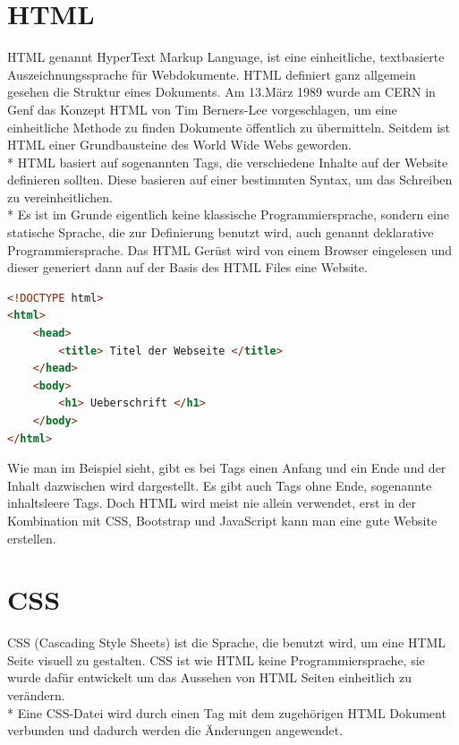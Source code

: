 \section{HTML}
\author{Benjamin Besic}
HTML genannt HyperText Markup Language, ist eine einheitliche, textbasierte Auszeichnungssprache für Webdokumente. HTML definiert ganz allgemein gesehen die Struktur eines Dokuments. 
Am 13.März 1989 wurde am CERN in Genf das Konzept HTML von Tim Berners-Lee vorgeschlagen, um eine einheitliche Methode zu finden Dokumente öffentlich zu übermitteln. Seitdem ist HTML  einer Grundbausteine des World Wide Webs geworden. \\*
HTML basiert auf sogenannten Tags, die verschiedene Inhalte auf der Website definieren sollten. Diese basieren auf einer bestimmten Syntax, um das Schreiben zu vereinheitlichen. \\*
Es ist im Grunde eigentlich keine klassische Programmiersprache, sondern eine statische Sprache, die zur Definierung benutzt wird, auch genannt deklarative Programmiersprache.  
Das HTML Gerüst wird von einem Browser eingelesen und dieser generiert dann auf der Basis des HTML Files eine Website. \cite{HTMLTut} \cite{HTMLSeoKueche}

\begin{lstlisting}[language=HTML,caption=HTML File Grundgerüst,label=lst:impl:foo]
<!DOCTYPE html>
<html>
    <head>
        <title> Titel der Webseite </title>
    </head>
    <body>
        <h1> Ueberschrift </h1>
    </body>
</html>
\end{lstlisting}

Wie man im Beispiel sieht, gibt es bei Tags einen Anfang und ein Ende und der Inhalt dazwischen wird dargestellt.
Es gibt auch Tags ohne Ende, sogenannte inhaltsleere Tags.
Doch HTML wird meist nie allein verwendet, erst in der Kombination mit CSS, Bootstrap und JavaScript kann man eine gute Website erstellen.

\section{CSS}
\author{Benjamin Besic}
CSS (Cascading Style Sheets) ist die Sprache, die benutzt wird, um eine HTML Seite visuell zu gestalten. CSS ist wie HTML keine Programmiersprache, sie wurde dafür entwickelt um das Aussehen von HTML Seiten einheitlich zu verändern.\\*
Eine CSS-Datei wird durch einen Tag mit dem zugehörigen HTML Dokument verbunden und dadurch werden die Änderungen angewendet. \cite{CSSMozilla}


